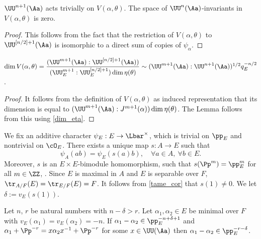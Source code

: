 \begin{lem}\label{invariants_super} $\UU^{n+1}(\Aa)$ acts trivially on $V(\alpha, \theta)$. The space of $\UU^n(\Aa)$-invariants in $V(\alpha, \theta)$ is zero.
\end{lem}

\begin{proof} This follows from the fact that the restriction of $V(\alpha, \theta)$ to $\UU^{[n/2]+1}(\Aa)$ is isomorphic to a direct sum of copies of $\psi_{\alpha}$.
\end{proof}

\skpt
\begin{lem}\label{dim_V}\mbox{}\par\vspace*{-10pt}
\centerline{
$\dim V(\alpha, \theta)=\dfrac{( \UU^{m+1}(\Aa): \UU^{[n/2]+1}(\Aa))}{ (\UU^{m+1}_E : \UU^{[n/2]+1}_E)\dim \eta(\theta)}\sim (\UU^{m+1}(\Aa): \UU^{n+1}(\Aa))^{1/2} q_E^{-n/2}$.}
\end{lem}

\begin{proof} It follows from the definition of $V(\alpha, \theta)$ as induced representation that its dimension is equal to $(\UU^{m+1}(\Aa): J^{m+1}(\alpha)) \dim \eta(\theta)$. The Lemma follows from this using \eqref{dim_eta}.
\end{proof}

We fix an additive character $\psi_E: E\to \Lbar^{\times}$, which is trivial on $\pp_E$ and nontrivial on $\cO_E$. There exists a unique map $s: A\to E$ such that
\begin{equation}\label{tame_cor}
\psi_A(ab)= \psi_E(s(a) b), \quad \forall a\in A,\ \forall b\in E.
\end{equation}
Moreover, $s$ is an $E\times E$-bimodule homomorphism, such that $s(\Pp^m)= \pp_E^m$ for all $m\in \ZZ$, \cite[(1.3.4)]{BK}. Since
$E$ is maximal in $A$ and $E$ is separable over $F$, $\tr_{A/F}(E)=\tr_{E/F}(E)=F$. It follows from \eqref{tame_cor} that $s(1)\neq 0$.
We let $\delta:= v_E(s(1))$.

\begin{lem}\label{main_lemma} Let $n$, $r$ be natural numbers with $n-\delta> r$.
Let $\alpha_1,\alpha_2\in E$ be minimal over $F$ with $v_E(\alpha_1)=v_E(\alpha_2)=-n.$ If $\alpha_1 - \alpha_2 \in \pp_E^{-n +\delta+1}$
and $\alpha_1+ \Pp^{-r} = x \alpha_2 x^{-1} + \Pp^{-r}$ for some $x\in \UU(\Aa)$ then $\alpha_1-\alpha_2 \in \pp_E^{-r-\delta}$.
\end{lem}

